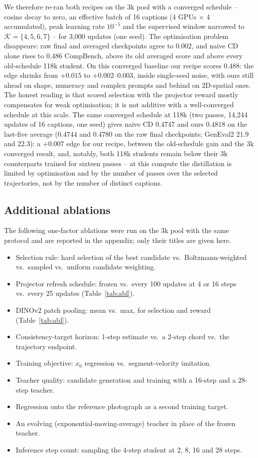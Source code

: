 \documentclass{article} %
\newcommand{\naive}{naive CD}
\begin{document}
We therefore re-ran both recipes on the 3k pool with a converged schedule -- cosine decay to zero,
an effective batch of 16 captions (4 GPUs $\times$ 4 accumulated), peak learning rate $10^{-5}$ and the
supervised window narrowed to $\mathcal K=\{4,5,6,7\}$ -- for 3,000 updates (one seed). The
optimisation problem disappears: raw final and averaged checkpoints agree to $0.002$, and \naive{} alone
rises to $0.486$ CompBench, above its old averaged score and above every old-schedule 118k student. On
this converged baseline our recipe scores $0.488$: the edge shrinks from $+0.015$ to $+0.002$--$0.003$,
inside single-seed noise, with ours still ahead on shape, numeracy and complex prompts and behind on
2D-spatial ones. The honest reading is that scored selection with the projector reward mostly
compensates for weak optimisation; it is not additive with a well-converged schedule at this scale. The
same converged schedule at 118k (two passes, 14,244 updates of 16 captions, one seed) gives \naive{}
$0.4747$ and ours $0.4818$ on the last-five average ($0.4744$ and $0.4780$ on the raw final checkpoints;
GenEval2 $21.9$ and $22.3$): a $+0.007$ edge for our recipe, between the old-schedule gain and the 3k
converged result, and, notably, both 118k students remain below their 3k counterparts trained for
sixteen passes -- at this compute the distillation is limited by optimisation and by the number of
passes over the selected trajectories, not by the number of distinct captions.

\subsection{Additional ablations}
\label{sec:appendix-titles}
The following one-factor ablations were run on the 3k pool with the same protocol and are reported in the
appendix; only their titles are given here.
\begin{itemize}
\item Selection rule: hard selection of the best candidate vs.\ Boltzmann-weighted vs.\ sampled vs.\ uniform candidate weighting.
\item Projector refresh schedule: frozen vs.\ every 100 updates at 4 or 16 steps vs.\ every 25 updates (Table~\ref{tab:abl}).
\item DINOv2 patch pooling: mean vs.\ max, for selection and reward (Table~\ref{tab:abl}).
\item Consistency-target horizon: 1-step estimate vs.\ a 2-step chord vs.\ the trajectory endpoint.
\item Training objective: $x_0$ regression vs.\ segment-velocity imitation.
\item Teacher quality: candidate generation and training with a 16-step and a 28-step teacher.
\item Regression onto the reference photograph as a second training target.
\item An evolving (exponential-moving-average) teacher in place of the frozen teacher.
\item Inference step count: sampling the 4-step student at 2, 8, 16 and 28 steps.
\end{itemize}
\end{document}
